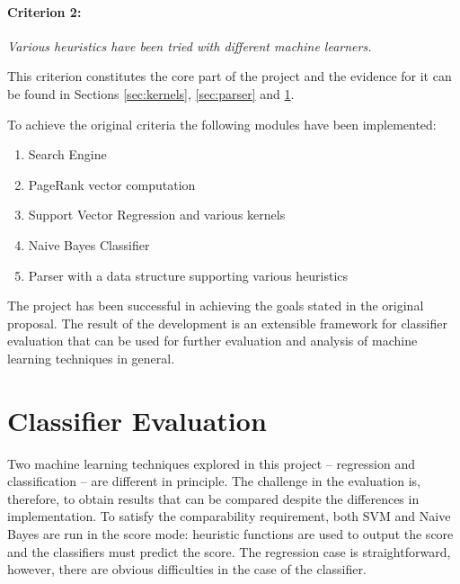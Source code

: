 \documentclass[12pt,notitlepage,twoside]{scrreprt}
\begin{document}
\paragraph{Criterion 2:}\textit{Various heuristics have been tried with different machine
learners.}

This criterion constitutes the core part of the project and the evidence for it can be
found in Sections \ref{sec:kernels}, \ref{sec:parser} and \ref{sec:eval_class}.

To achieve the original criteria the following modules have been implemented:
\begin{enumerate}
	\item Search Engine
	\item PageRank vector computation
	\item Support Vector Regression and various kernels 
	\item Naive Bayes Classifier
	\item Parser with a data structure supporting various heuristics
\end{enumerate}

The project has been successful in achieving the goals stated in the original proposal.
The result of the development is an extensible framework for classifier evaluation that
can be used for further evaluation and analysis of machine learning techniques in general.
\section{Classifier Evaluation}
\label{sec:eval_class}
Two machine learning techniques explored in this project -- regression and classification
-- are different in principle. The challenge in the evaluation is, therefore, to obtain
results that can be compared despite the differences in implementation. To satisfy the
comparability requirement, both SVM and Naive Bayes are run in the score mode: heuristic
functions are used to output the score and the classifiers must predict the score. The
regression case is straightforward, however, there are obvious difficulties in the case of
the classifier. 
\end{document}
